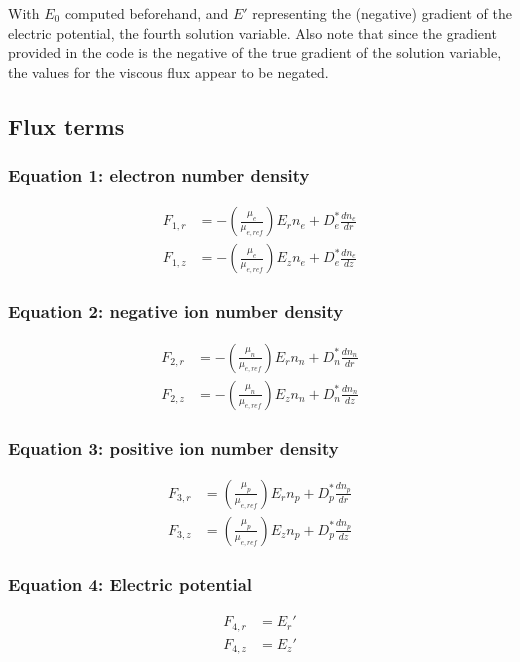 \documentclass[12pt, a4paper]{report}
\begin{document}
With $E_0$ computed beforehand, and $E'$ representing the (negative) gradient of the electric potential, the fourth solution variable. Also note that since the gradient provided in the code is the negative of the true gradient of the solution variable, the values for the viscous flux appear to be negated.

\subsection*{Flux terms}

\subsubsection*{Equation 1: electron number density}
\begin{align*}
    F_{1,r} &= -\left( \frac{\mu_e}{\mu_{e,ref}} \right)E_rn_e + D_e^* \frac{dn_e}{dr}\\
    F_{1,z} &= -\left( \frac{\mu_e}{\mu_{e,ref}} \right)E_zn_e + D_e^* \frac{dn_e}{dz}
\end{align*}

\subsubsection*{Equation 2: negative ion number density}
\begin{align*}
    F_{2,r} &= -\left( \frac{\mu_n}{\mu_{e,ref}} \right)E_r n_n + D_n^*  \frac{dn_n}{dr}\\
    F_{2,z} &= -\left( \frac{\mu_n}{\mu_{e,ref}} \right)E_z n_n + D_n^*  \frac{dn_n}{dz}
\end{align*}


\subsubsection*{Equation 3: positive ion number density}
\begin{align*}
    F_{3,r} &= \left( \frac{\mu_p}{\mu_{e,ref}} \right)E_rn_p + D_p^*  \frac{dn_p}{dr}\\
    F_{3,z} &= \left( \frac{\mu_p}{\mu_{e,ref}} \right)E_zn_p + D_p^*  \frac{dn_p}{dz}
\end{align*}

\subsubsection*{Equation 4: Electric potential}

\begin{align*}
    F_{4,r} &= E_{r}'\\
    F_{4,z} &= E_{z}'
\end{align*}
\end{document}
